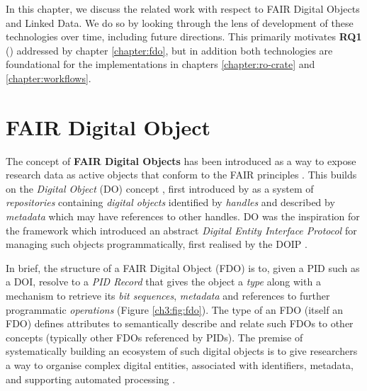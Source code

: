 \label{ch3:background}

In this chapter, we discuss the related work with respect to FAIR Digital Objects and Linked Data. We do so by looking through the lens of development of these technologies over time, including future directions. This primarily motivates \textbf{RQ1} () addressed by chapter \ref{chapter:fdo}, but in addition both technologies are foundational for the implementations in chapters \ref{chapter:ro-crate} and \ref{chapter:workflows}.


\section{FAIR Digital Object}\label{ch3:fdo}


The concept of \textbf{FAIR Digital Objects} \cite{Schultes 2019} has been introduced as a way to expose research data as active objects that conform to the FAIR principles \cite{Wilkinson 2016}. This builds on the \emph{Digital Object} (DO) concept \cite{Kahn 2006}, first introduced by \cite{Kahn 1995} as a system of \emph{repositories} containing \emph{digital objects} identified by \emph{handles} \cite{Sun 2003a} and described by \emph{metadata} which may have references to other handles. DO was the inspiration for the \cite{ITU-T X.1255} framework which introduced an abstract \emph{Digital Entity Interface Protocol} for managing such objects programmatically, first realised by the 
\acrfull{DOIP}
\cite{Reilly 2009}.

In brief, the structure of a FAIR Digital Object (FDO) is to, given a 
\acrfull{PID}
such as a \acrshort{DOI}, resolve to a \emph{PID Record} that gives the object a \emph{type} along with a mechanism to retrieve its \emph{bit sequences}, \emph{metadata} and references to further programmatic \emph{operations} (Figure \vref{ch3:fig:fdo}). The type of an FDO (itself an FDO) defines attributes to semantically describe and relate such FDOs to other concepts (typically other FDOs referenced by PIDs). The premise of systematically building an ecosystem of such digital objects is to give researchers a way to organise complex digital entities, associated with identifiers, metadata, and supporting automated processing \cite{Wittenburg 2019}.


